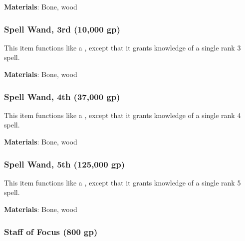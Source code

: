 \vspace{0.25em}
\textbf{Materials}: Bone, wood


\lowercase{\hypertarget{item:Spell Wand, 3rd}{}}\label{item:Spell Wand, 3rd}
\hypertarget{item:Spell Wand, 3rd}{\subsubsection{Spell Wand, 3rd\hfill{} (10,000 gp)}}

This item functions like a , except that it grants knowledge of a single rank 3 spell.



\vspace{0.25em}
\textbf{Materials}: Bone, wood


\lowercase{\hypertarget{item:Spell Wand, 4th}{}}\label{item:Spell Wand, 4th}
\hypertarget{item:Spell Wand, 4th}{\subsubsection{Spell Wand, 4th\hfill{} (37,000 gp)}}

This item functions like a , except that it grants knowledge of a single rank 4 spell.



\vspace{0.25em}
\textbf{Materials}: Bone, wood


\lowercase{\hypertarget{item:Spell Wand, 5th}{}}\label{item:Spell Wand, 5th}
\hypertarget{item:Spell Wand, 5th}{\subsubsection{Spell Wand, 5th\hfill{} (125,000 gp)}}

This item functions like a , except that it grants knowledge of a single rank 5 spell.



\vspace{0.25em}
\textbf{Materials}: Bone, wood


\lowercase{\hypertarget{item:Staff of Focus}{}}\label{item:Staff of Focus}
\hypertarget{item:Staff of Focus}{\subsubsection{Staff of Focus\hfill{} (800 gp)}}

